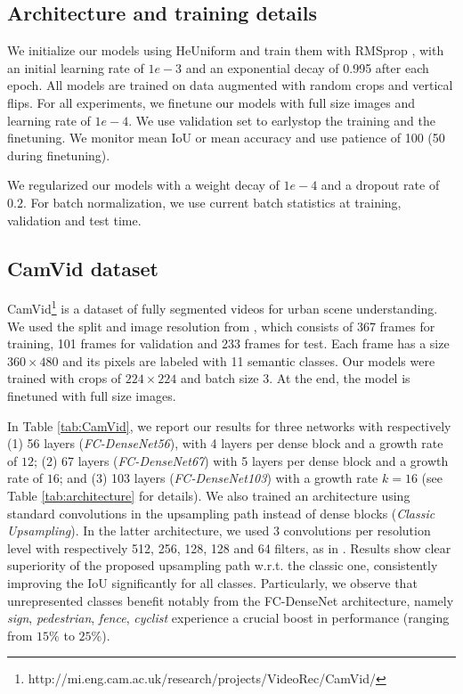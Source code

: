 \documentclass[10pt,twocolumn,letterpaper]{article}
\begin{document}
\subsection{Architecture and training details}
\label{ssec:details}

We initialize our models using HeUniform \cite{HeZR015} and train them with RMSprop \cite{rmsprop}, with an initial learning rate of $1e-3$ and an exponential decay of 0.995 after each epoch. All models are trained on data augmented with random crops and vertical flips. For all experiments, we finetune our models with full size images and learning rate of $1e-4$. We use validation set to earlystop the training and the finetuning. We monitor mean IoU or mean accuracy and use patience of 100 (50 during finetuning). 

We regularized our models with a weight decay of $1e-4$ and a dropout rate of $0.2$. For batch normalization, we use current batch statistics at training, validation and test time.


\subsection{CamVid dataset}

CamVid\footnote{http://mi.eng.cam.ac.uk/research/projects/VideoRec/CamVid/} \cite{camvid} is a dataset of fully segmented videos for urban scene understanding. We used the split and image resolution from \cite{SegNet2015}, which consists of 367 frames for training, 101 frames for validation and 233 frames for test. Each frame has a size $360 \times 480$ and its pixels are labeled with 11 semantic classes. Our models were trained with crops of $224 \times 224$ and batch size 3. At the end, the model is finetuned with full size images.

In Table \ref{tab:CamVid}, we report our results for three networks with respectively (1) 56 layers (\emph{FC-DenseNet56}), with 4 layers per dense block and a growth rate of $12$; (2) 67 layers (\emph{FC-DenseNet67}) with 5 layers per dense block and a growth rate of $16$; and (3) 103 layers (\emph{FC-DenseNet103}) with a growth rate $k=16$ (see Table \ref{tab:architecture} for details). We also trained an architecture using standard convolutions in the upsampling path instead of dense blocks (\emph{Classic Upsampling}). In the latter architecture, we used 3 convolutions per resolution level with respectively 512, 256, 128, 128 and 64 filters, as in \cite{ronneberger2015u}. Results show clear superiority of the proposed upsampling path w.r.t. the classic one, consistently improving the IoU significantly for all classes. Particularly, we observe that unrepresented classes benefit notably from the FC-DenseNet architecture, namely \emph{sign}, \emph{pedestrian}, \emph{fence}, \emph{cyclist} experience a crucial boost in performance (ranging from $15\%$ to $25\%$).
\end{document}
